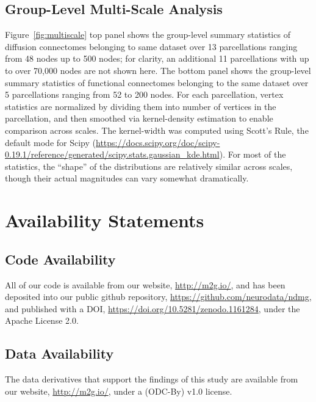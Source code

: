 \documentclass[11pt]{article}
\begin{document}
\subsection{Group-Level Multi-Scale Analysis}
\label{app:multi}

Figure~\ref{fig:multiscale} top panel shows the group-level summary statistics of diffusion connectomes belonging to same dataset over 13 parcellations ranging from 48 nodes up to 500 nodes; for clarity, an additional 11 parcellations with up to over 70,000 nodes are not shown here. The bottom panel shows the group-level summary statistics of functional connectomes belonging to the same dataset over 5 parcellations ranging from 52 to 200 nodes. 
For each parcellation, vertex statistics are normalized by dividing them into number of vertices in the parcellation, and then smoothed via kernel-density estimation to enable comparison across scales. The kernel-width was computed using Scott's Rule, the default mode for Scipy (\url{https://docs.scipy.org/doc/scipy-0.19.1/reference/generated/scipy.stats.gaussian_kde.html}).
For most of the statistics, the ``shape'' of the distributions  are relatively similar across scales, though their actual magnitudes can vary somewhat dramatically.







\section{Availability Statements}

\subsection{Code Availability}

All of our code is available from our website, \url{http://m2g.io/},  and has been deposited into our public github repository, \url{https://github.com/neurodata/ndmg}, and published with a DOI, \url{https://doi.org/10.5281/zenodo.1161284}, under the Apache License 2.0. 

\subsection{Data Availability}

The data derivatives that support the findings of this study are available from our website, \url{http://m2g.io/},  under a (ODC-By) v1.0 license.
\end{document}
